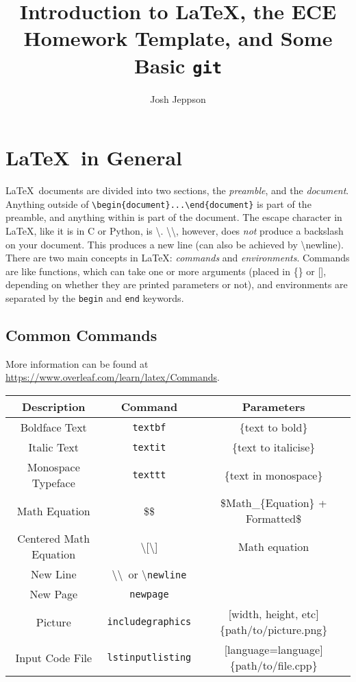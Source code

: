 \documentclass[a4paper,10pt]{article}
\title{Introduction to \LaTeX, the ECE Homework Template, and Some Basic \texttt{git}}
\author{Josh Jeppson}
\begin{document}
\maketitle
\section{\LaTeX\ in General}

\LaTeX\ documents are divided into two sections, the \emph{preamble}, and the \emph{document}. Anything outside of \texttt{\textbackslash begin\{document\}...\textbackslash end\{document\}} is part of the preamble, and anything within is part of the document. The escape character in \LaTeX, like it is in C or Python, is \textbackslash. \textbackslash\textbackslash, however, does \emph{not} produce a backslash on your document. This produces a new line (can also be achieved by \textbackslash newline).
\\[10pt]
There are two main concepts in \LaTeX: \emph{commands} and \emph{environments}. Commands are like functions, which can take one or more arguments (placed in \{\} or [], depending on whether they are printed parameters or not), and environments are separated by the \texttt{begin} and \texttt{end} keywords.

\subsection{Common Commands}

More information can be found at \url{https://www.overleaf.com/learn/latex/Commands}.

\begin{center}
	\begin{tabular}{|c|c|c|} \hline
		\textbf{Description} & \textbf{Command} & \textbf{Parameters} \\ \hline
		Boldface Text & \texttt{textbf} & \{text to bold\}\\
		Italic Text & \texttt{textit} & \{text to italicise\} \\
		Monospace Typeface  & \texttt{texttt} & \{text in monospace\} \\
		Math Equation & \$\$ & \$Math\_\{Equation\} + Formatted\$ \\
		Centered Math Equation & \textbackslash[\textbackslash] & Math equation  \\
		New Line & \textbackslash\textbackslash\ or \textbackslash \texttt{newline} & \\
		New Page &  \texttt{newpage} & \\
		Picture & \texttt{includegraphics} & [width, height, etc]\{path/to/picture.png\} \\
		Input Code File & \texttt{lstinputlisting} & [language=language]\{path/to/file.cpp\} \\ \hline
	\end{tabular}
\end{center}
\end{document}
